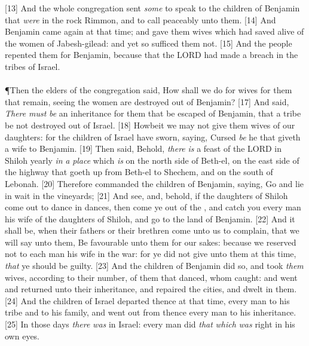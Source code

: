 [13] \textcolor[cmyk]{0.99998,1,0,0}{And the whole congregation sent \emph{some} to speak to the children of Benjamin that \emph{were} in the rock Rimmon, and to call peaceably unto them.}
[14] \textcolor[cmyk]{0.99998,1,0,0}{And Benjamin came again at that time; and  gave them wives which  had saved alive of the women of Jabesh-gilead: and yet so  sufficed them not.}
[15] \textcolor[cmyk]{0.99998,1,0,0}{And the people repented them for Benjamin, because that the LORD had made a breach in the tribes of Israel.}\\
\\
\P \textcolor[cmyk]{0.99998,1,0,0}{Then the elders of the congregation said, How shall we do for wives for them that remain, seeing the women are destroyed out of Benjamin?}
[17] \textcolor[cmyk]{0.99998,1,0,0}{And  said, \emph{There} \emph{must} \emph{be} an inheritance for them that be escaped of Benjamin, that a tribe be not destroyed out of Israel.}
[18] \textcolor[cmyk]{0.99998,1,0,0}{Howbeit we may not give them wives of our daughters: for the children of Israel have sworn, saying, Cursed \emph{be} he that giveth a wife to Benjamin.}
[19] \textcolor[cmyk]{0.99998,1,0,0}{Then  said, Behold, \emph{there} \emph{is} a feast of the LORD in Shiloh yearly \emph{in} \emph{a} \emph{place} which \emph{is} on the north side of Beth-el, on the east side of the highway that goeth up from Beth-el to Shechem, and on the south of Lebonah.}
[20] \textcolor[cmyk]{0.99998,1,0,0}{Therefore  commanded the children of Benjamin, saying, Go and lie in wait in the vineyards;}
[21] \textcolor[cmyk]{0.99998,1,0,0}{And see, and, behold, if the daughters of Shiloh come out to dance in dances, then come ye out of the , and catch you every man his wife of the daughters of Shiloh, and go to the land of Benjamin.}
[22] \textcolor[cmyk]{0.99998,1,0,0}{And it shall be, when their fathers or their brethren come unto us to complain, that we will say unto them, Be favourable unto them for our sakes: because we reserved not to each man his wife in the war: for ye did not give unto them at this time, \emph{that} ye should be guilty.}
[23] \textcolor[cmyk]{0.99998,1,0,0}{And the children of Benjamin did so, and took \emph{them} wives, according to their number, of them that danced, whom  caught: and  went and returned unto their inheritance, and repaired the cities, and dwelt in them.}
[24] \textcolor[cmyk]{0.99998,1,0,0}{And the children of Israel departed thence at that time, every man to his tribe and to his family, and  went out from thence every man to his inheritance.}
[25] \textcolor[cmyk]{0.99998,1,0,0}{In those days \emph{there} \emph{was}  in Israel: every man did \emph{that} \emph{which} \emph{was} right in his own eyes.}
